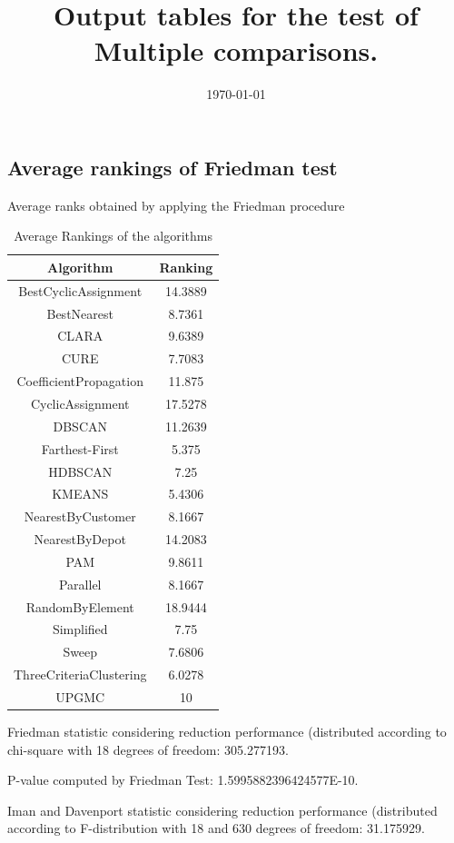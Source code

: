 \documentclass[a4paper,10pt]{article}
\title{Output tables for the test of Multiple comparisons.}
\author{}
\date{\today}
\begin{document}
\begin{landscape}
\pagestyle{empty}
\maketitle
\thispagestyle{empty}
\section{Average rankings of Friedman test}



Average ranks obtained by applying the Friedman procedure

\begin{table}[!htp]
\centering
\begin{tabular}{|c|c|}\hline
Algorithm&Ranking\\\hline
BestCyclicAssignment & 14.3889\\
BestNearest & 8.7361\\
CLARA & 9.6389\\
CURE & 7.7083\\
CoefficientPropagation & 11.875\\
CyclicAssignment & 17.5278\\
DBSCAN & 11.2639\\
Farthest-First & 5.375\\
HDBSCAN & 7.25\\
KMEANS & 5.4306\\
NearestByCustomer & 8.1667\\
NearestByDepot & 14.2083\\
PAM & 9.8611\\
Parallel & 8.1667\\
RandomByElement & 18.9444\\
Simplified & 7.75\\
Sweep & 7.6806\\
ThreeCriteriaClustering & 6.0278\\
UPGMC & 10\\
\hline
\end{tabular}
\caption{Average Rankings of the algorithms}
\end{table}

Friedman statistic considering reduction performance (distributed according to chi-square with 18 degrees of freedom: 305.277193.

P-value computed by Friedman Test: 1.5995882396424577E-10.\newline

Iman and Davenport statistic considering reduction performance (distributed according to F-distribution with 18 and 630 degrees of freedom: 31.175929.


\end{landscape}
\end{document}

